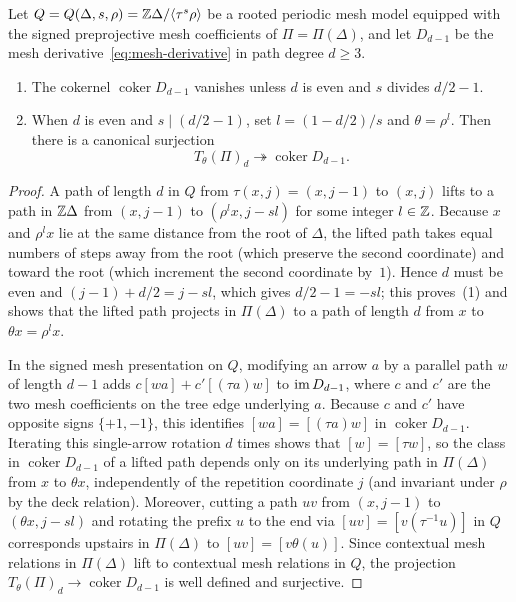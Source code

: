 \begin{lemma}
\label{lem:twisted-trace-surjection}
Let $Q=Q(\Delta,s,\rho)=\mathbb Z\Delta/\langle\tau^s\rho\rangle$ be a rooted periodic mesh model equipped with the signed preprojective mesh coefficients of $\Pi=\Pi(\Delta)$, and let $D_{d-1}$ be the mesh derivative~\eqref{eq:mesh-derivative} in path degree $d\geq3$.
\begin{enumerate}[label={\upshape(\arabic*)}]
\item The cokernel $\operatorname{coker}D_{d-1}$ vanishes unless $d$ is even and $s$ divides $d/2-1$.
\item When $d$ is even and $s\mid(d/2-1)$, set $l=(1-d/2)/s$ and $\theta=\rho^l$. Then there is a canonical surjection
\[
  T_\theta(\Pi)_d\twoheadrightarrow\operatorname{coker}D_{d-1}.
\]
\end{enumerate}
\end{lemma}
\begin{proof}
A path of length $d$ in $Q$ from $\tau(x,j)=(x,j-1)$ to $(x,j)$ lifts to a path in $\mathbb Z\Delta$ from $(x,j-1)$ to $(\rho^l x,j-sl)$ for some integer $l\in\mathbb Z$. Because $x$ and $\rho^l x$ lie at the same distance from the root of $\Delta$, the lifted path takes equal numbers of steps away from the root (which preserve the second coordinate) and toward the root (which increment the second coordinate by~$1$). Hence $d$ must be even and $(j-1)+d/2=j-sl$, which gives $d/2-1=-sl$; this proves~(1) and shows that the lifted path projects in $\Pi(\Delta)$ to a path of length $d$ from $x$ to $\theta x=\rho^l x$.

In the signed mesh presentation on $Q$, modifying an arrow $a$ by a parallel path $w$ of length $d-1$ adds $c[wa]+c'[(\tau a)w]$ to $\operatorname{im} D_{d-1}$, where $c$ and $c'$ are the two mesh coefficients on the tree edge underlying $a$. Because $c$ and $c'$ have opposite signs $\{+1,-1\}$, this identifies $[wa]=[(\tau a)w]$ in $\operatorname{coker}D_{d-1}$. Iterating this single-arrow rotation $d$ times shows that $[w]=[\tau w]$, so the class in $\operatorname{coker}D_{d-1}$ of a lifted path depends only on its underlying path in $\Pi(\Delta)$ from $x$ to $\theta x$, independently of the repetition coordinate $j$ (and invariant under $\rho$ by the deck relation). Moreover, cutting a path $uv$ from $(x,j-1)$ to $(\theta x,j-sl)$ and rotating the prefix $u$ to the end via $[uv]=[v(\tau^{-1}u)]$ in $Q$ corresponds upstairs in $\Pi(\Delta)$ to $[uv]=[v\theta(u)]$. Since contextual mesh relations in $\Pi(\Delta)$ lift to contextual mesh relations in $Q$, the projection $T_\theta(\Pi)_d\to\operatorname{coker}D_{d-1}$ is well defined and surjective.
\end{proof}

